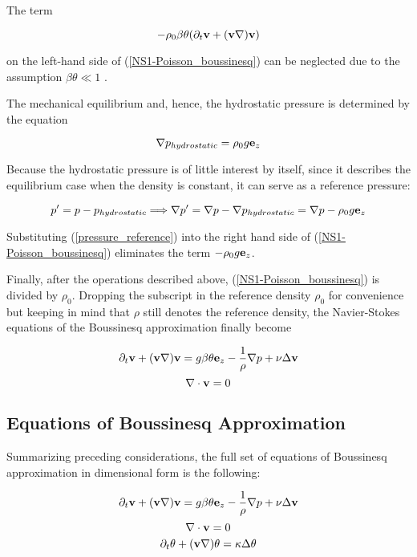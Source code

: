 The term 

$$ -\rho_0\beta\theta (\partial_t\mathbf{v} + (\mathbf{v}\nabla)\mathbf{v})$$

on the left-hand side of (\ref{NS1-Poisson_boussinesq}) can be neglected due to the assumption $ \beta\theta \ll 1$ \cite{convective_stability}.

The mechanical equilibrium and, hence, the hydrostatic pressure is determined by the equation 

$$ \nabla p_{hydrostatic} = \rho_0 g \mathbf{e}_z$$

Because the hydrostatic pressure is of little interest by itself, since it describes the equilibrium case when the density is constant, it can serve as a reference pressure:

\begin{equation} \label{pressure_reference}
p^{\prime} = p - p_{hydrostatic} \Longrightarrow \nabla p^{\prime} = \nabla p - \nabla p_{hydrostatic} = \nabla p - \rho_0 g \mathbf{e}_z
\end{equation}

Substituting (\ref{pressure_reference}) into the right hand side of (\ref{NS1-Poisson_boussinesq}) eliminates the term $-\rho_0 g\mathbf{e}_z$. 

Finally, after the operations described above, (\ref{NS1-Poisson_boussinesq}) is divided by $\rho_0$. Dropping the subscript in the reference density $\rho_0$ for convenience but keeping in mind that $\rho$ still denotes the reference density, the Navier-Stokes equations of the Boussinesq approximation finally become 

\begin{equation} \label{NS1-Poisson}
\partial_t\mathbf{v} + (\mathbf{v}\nabla)\mathbf{v} = g\beta\theta \mathbf{e}_z - \frac{1}{\rho} \nabla p + \nu \Delta\mathbf{v}
\end{equation}
\begin{equation} \label{NS2-Poisson}
\nabla\cdot \mathbf{v} = 0
\end{equation}

\subsection{Equations of Boussinesq Approximation}

Summarizing preceding considerations, the full set of equations of Boussinesq approximation in dimensional form is the following:

\begin{equation} 
\partial_t\mathbf{v} + (\mathbf{v}\nabla)\mathbf{v} = g\beta\theta \mathbf{e}_z - \frac{1}{\rho} \nabla p + \nu \Delta\mathbf{v}
\end{equation}
\begin{equation} 
\nabla\cdot \mathbf{v} = 0
\end{equation}
\begin{equation} 
\partial_t\theta + (\mathbf{v}\nabla)\theta = \kappa \Delta\theta 
\end{equation}

